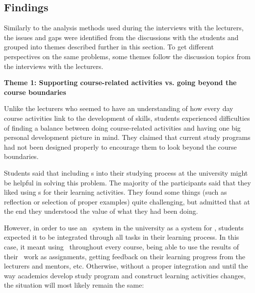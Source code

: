 \subsection{Findings}

Similarly to the analysis methods used during the interviews with the lecturers,
the issues and gaps were identified from the discussions with the students and
grouped into themes described further in this section. To get different
perspectives on the same problems, some themes follow the discussion topics from
the interviews with the lecturers.

\textbf{Theme 1: Supporting course-related activities vs. going beyond the
course boundaries}

Unlike the lecturers who seemed to have an understanding of how every day
course activities link to the development of \LLLs skills, students experienced
difficulties of finding a balance between doing course-related activities and
having one big personal development picture in mind. They claimed that current
study programs had not been designed properly to encourage them to look
beyond the course boundaries.


Students said that including \ep s into their studying process at the university
might be helpful in solving this problem. The majority of the participants said
that they liked using \ep s for their learning activities. They found some
things (such as reflection or selection of proper examples) quite challenging,
but admitted that at the end they understood the value of what they had been
doing.

However, in order to use an \ep~system in the university as a system for \LLLsn,
students expected it to be integrated through all tasks in their learning
process. In this case, it meant using \ep~throughout every course, being able to
use the results of their \ep~work as assignments, getting feedback on their
learning progress from the lecturers and mentors, etc. Otherwise, without a
proper integration and until the way academics develop study program and
construct learning activities changes, the situation will most likely remain the
same:


